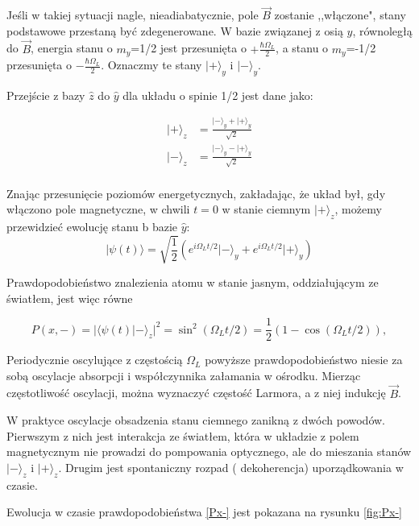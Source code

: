 \documentclass[a4paper,10pt]{article}
\begin{document}
Jeśli w takiej sytuacji nagle, nieadiabatycznie, pole $\vec B$ zostanie ,,włączone", stany podstawowe przestaną być zdegenerowane. W bazie związanej z osią $\hat y$, równoległą do $\vec B$, energia stanu o $m_y$=1/2 jest przesunięta o $+\frac{\hbar \Omega_L}{2}$, a stanu o $m_y$=-1/2 przesunięta o $-\frac{\hbar \Omega_L}{2}$. Oznaczmy te stany $\lvert + \rangle_y$ i $\lvert - \rangle_y$.

Przejście z bazy $\hat z$ do $\hat y$ dla układu o spinie 1/2 jest dane jako:

\begin{align}
\lvert + \rangle_z &=\frac{\lvert - \rangle_y + \lvert + \rangle_y}{\sqrt{2}}\\
\lvert - \rangle_z &=\frac{\lvert - \rangle_y - \lvert + \rangle_y}{\sqrt{2}}\\
\end{align}

Znając przesunięcie poziomów energetycznych, zakładając, że układ był, gdy włączono pole magnetyczne, w chwili $t=0$ w stanie ciemnym $\lvert + \rangle_z$, możemy przewidzieć ewolucję stanu b bazie $\hat y$:
\begin{equation}
\lvert \psi(t) \rangle = \sqrt{\frac{1}{2}} \left( e^{i \Omega_L t/2} \lvert - \rangle_y + e^{i \Omega_L t/2} \lvert + \rangle_y \right)
\end{equation} 
 
Prawdopodobieństwo znalezienia atomu w stanie jasnym, oddziałującym ze światłem, jest więc równe

 \begin{equation}
P \left( x,- \right)= \lvert \langle \psi(t) \lvert - \rangle_z \rvert^2 = \sin^2 (\Omega_L t/2)= \frac{1}{2}\left(1-\cos(\Omega_L t/2) \right),
\label{Px-} 
\end{equation} 

Periodycznie oscylujące z częstością $\Omega_L$ powyższe prawdopodobieństwo niesie za sobą oscylacje absorpcji i współczynnika załamania w ośrodku. Mierząc częstotliwość oscylacji, można wyznaczyć częstość Larmora, a z niej indukcję $\vec B$.

W praktyce oscylacje obsadzenia stanu ciemnego zanikną z dwóch powodów. Pierwszym z nich jest interakcja ze światłem, która w układzie z polem magnetycznym nie prowadzi do pompowania optycznego, ale do mieszania stanów $\lvert - \rangle_z$ i $\lvert + \rangle_z$. Drugim jest spontaniczny rozpad ( dekoherencja) uporządkowania w czasie.

Ewolucja w czasie prawdopodobieństwa \ref{Px-} jest pokazana na rysunku \ref{fig:Px-}
\end{document}
